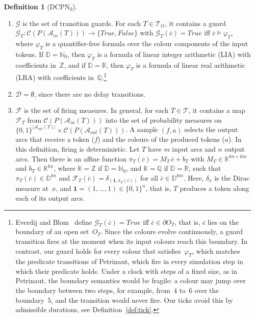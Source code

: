 \documentclass[11pt]{article}
\theoremstyle{definition}
\newcommand{\NatZero}{\mathbb{N}_0}
\newcommand{\Real}{\mathbb{R}}
\newcommand{\Int}{\mathbb{Z}}
\newcommand{\Rat}{\mathbb{Q}}
\newcommand{\Coef}{\mathbb{K}}
\newcommand{\Dom}{\mathbb{D}}
\newcommand{\cvec}{\overline{c}}
\newcommand{\DCPN}[1]{\texorpdfstring{\textup{DCPN}\ensuremath{_{#1}}}{DCPN#1}}
\newtheorem{definition}{Definition}
\begin{document}
\begin{definition}[\DCPN{0}]
\begin{enumerate}
    \item $\mathcal{G}$ is the set of transition guards. For each
      $T \in \mathcal{T}_G$, it contains a guard
      $\mathcal{G}_T : \mathcal{C}(P(\mathcal{A}_{\mathit{in}}(T)))
        \to \{\mathit{True}, \mathit{False}\}$
      with $\mathcal{G}_T(\cvec) = \mathit{True}$ iff $\cvec \models \varphi_T$,
      where $\varphi_T$ is a quantifier-free formula over the colour
      components of the input tokens. If $\Dom = \NatZero$, then $\varphi_T$
      is a formula of linear integer arithmetic (LIA) with coefficients
      in~$\Int$, and if $\Dom = \Real$, then $\varphi_T$ is a formula of
      linear real arithmetic (LRA) with coefficients in~$\Rat$.\footnote{%
        Everdij and Blom~\cite{EverdijBlom2005} define
        $\mathcal{G}_T(\cvec) = \mathit{True}$ iff $\cvec \in \partial O_T$, that is,
        $\cvec$ lies on the boundary of an open set~$O_T$. Since the colours
        evolve continuously, a guard transition fires at the moment when its
        input colours reach this boundary. In contrast, our guard holds for
        every colour that satisfies~$\varphi_T$, which matches the predicate
        transitions of Petrinaut, which fire in every simulation step in which
        their predicate holds. Under a clock with steps of a fixed size, as
        in Petrinaut, the boundary semantics would be fragile: a colour may
        jump over the boundary between two steps, for example, from~$4$
        to~$6$ over the boundary~$5$, and the transition would never fire.
        Our ticks avoid this by admissible durations, see
        Definition~\ref{def:tick}.}

    \item $\mathcal{D} = \emptyset$, since there are no delay transitions.

    \item $\mathcal{F}$ is the set of firing measures. In general, for each
      $T \in \mathcal{T}$, it contains a map $\mathcal{F}_T$ from
      $\mathcal{C}(P(\mathcal{A}_{\mathit{in}}(T)))$ into the set of
      probability measures on
      $\{0, 1\}^{|\mathcal{A}_{\mathit{out}}(T)|}
        \times \mathcal{C}(P(\mathcal{A}_{\mathit{out}}(T)))$.
      A sample $(f, a)$ selects the output arcs that receive a token ($f$)
      and the colours of the produced tokens ($a$).
      In this definition, firing is deterministic. Let $T$ have $m$ input arcs
      and $n$ output arcs. Then there is an affine function
      $\pi_T(\cvec) = M_T\, \cvec + b_T$ with $M_T \in \Coef^{kn \times
      km}$ and $b_T \in \Coef^{kn}$, where $\Coef = \Int$ if
      $\Dom = \NatZero$, and $\Coef = \Rat$ if $\Dom = \Real$, such that
      $\pi_T(\cvec) \in \Dom^{kn}$ and
      $\mathcal{F}_T(\cvec) = \delta_{(\mathbf{1}, \pi_T(\cvec))}$ for all
      $\cvec \in \Dom^{km}$. Here, $\delta_x$ is the Dirac measure at~$x$, and
      $\mathbf{1} = (1, \dots, 1) \in \{0, 1\}^n$, that is, $T$ produces
      a token along each of its output arcs.


\end{enumerate}
\end{definition}
\end{document}
